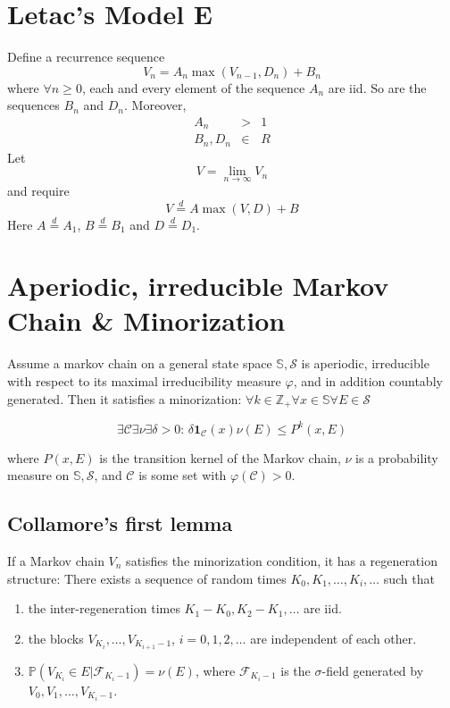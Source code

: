 \documentclass[12pt]{article}
\newcommand{\p}{
        \mathbb{P}
}
\newcommand{\I}[1]{
        \mathbf 1_{#1}
}
\begin{document}
\maketitle
\section{Letac's Model E}
Define a recurrence sequence
\[
V_n = A_n \max(V_{n-1}, D_n) + B_n
\]
where $\forall n \geq 0$, each and every element of the sequence $A_n$
are iid. So are the sequences $B_n$ and $D_n$. Moreover,
\begin{eqnarray*}
  A_n &>& 1 \\
  B_n, D_n &\in& R
\end{eqnarray*}
Let
\[
V = \lim_{n \to \infty} V_n
\]
and require
\[
V  \overset{d}{=} A \max(V, D) + B
\]
Here $A \overset{d}{=} A_1$, $B \overset{d}{=} B_1$ and $D \overset{d}{=} D_1$.
\section{Aperiodic, irreducible Markov Chain \& Minorization}
Assume a markov chain on a general state space $\mathbb S, \mathcal S$
is aperiodic, irreducible with respect to its maximal irreducibility
measure $\varphi$, and in addition countably generated. Then it satisfies
a minorization: $\forall k \in \mathbb Z_+ \forall x \in \mathbb S
\forall E \in \mathcal S$

\begin{equation}\label{eq:M}
\exists \mathcal C \exists \nu \exists \delta > 0\text{: }
\delta \I{\mathcal C}(x) \nu(E) \leq P^k(x, E)
\end{equation}

where $P(x, E)$ is the transition kernel of the Markov chain, $\nu$
is a probability measure on $\mathbb S, \mathcal S$, and $\mathcal C$
is some set with $\varphi(\mathcal C) > 0$.

\subsection{Collamore's first lemma}
If a Markov chain $V_n$ satisfies the minorization condition, it has a
regeneration structure: There exists a sequence of random times $K_0,
K_1, \dots, K_i, \dots$ such that
\begin{enumerate}
\item the inter-regeneration times $K_1 - K_0, K_2 - K_1, \dots$ are iid.
\item the blocks $V_{K_i}, \dots, V_{K_{i+1}-1}$, $i=0, 1, 2, \dots$ are
independent of each other.

\item $\p(V_{K_i} \in E | \mathcal F_{K_i - 1}) = \nu(E)$, where $\mathcal
F_{K_i - 1}$ is the $\sigma$-field generated by $V_0, V_1, \dots, V_{K_i-1}$.
\end{enumerate}
\end{document}
